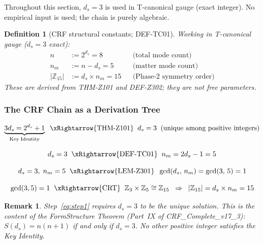 \documentclass[12pt, a4paper]{article}
\newtheorem{definition}{Definition}[section]
\newtheorem{remark}{Remark}[section]
\begin{document}
Throughout this section, $d_s = 3$ is used in T-canonical gauge
(exact integer). No empirical input is used; the chain is purely
algebraic.

\begin{definition}[CRF structural constants; DEF-TC01]
\label{def:crf-constants}
Working in T-canonical gauge ($d_s = 3$ exact):
\begin{align}
  n &:= 2^{d_s} = 8 & &\text{(total mode count)} \\
  n_m &:= n - d_s = 5 & &\text{(matter mode count)} \\
  |\mathbb{Z}_{15}| &:= d_s \times n_m = 15 & &\text{(Phase-2 symmetry order)}
\end{align}
These are derived from THM-Z101 and DEF-Z302; they are not free
parameters.
\end{definition}

\subsubsection{The CRF Chain as a Derivation Tree}

\begin{formalbox}[title={CRF derivation chain (EQ-TC01)}]
\begin{equation}
  \underbrace{3d_s = 2^{d_s}+1}_{\rm Key\;Identity}
  \;\;\xRightarrow{\rm THM\text{-}Z101}\;\;
  d_s = 3 \;\;(\text{unique among positive integers})
  \label{eq:step1}
\end{equation}

\begin{equation}
  d_s = 3
  \;\;\xRightarrow{\rm DEF\text{-}TC01}\;\;
  n_m = 2d_s - 1 = 5
  \label{eq:step2}
\end{equation}

\begin{equation}
  d_s = 3,\; n_m = 5
  \;\;\xRightarrow{\rm LEM\text{-}Z301}\;\;
  \gcd(d_s,\, n_m) = \gcd(3,\, 5) = 1
  \label{eq:step3}
\end{equation}

\begin{equation}
  \gcd(3,5) = 1
  \;\;\xRightarrow{\rm CRT}\;\;
  \mathbb{Z}_3 \times \mathbb{Z}_5 \cong \mathbb{Z}_{15}
  \;\;\Rightarrow\;\;
  |\mathbb{Z}_{15}| = d_s \times n_m = 15
  \label{eq:step4}
\end{equation}
\end{formalbox}

\begin{remark}
Step~\eqref{eq:step1} requires $d_s = 3$ to be the unique solution.
This is the content of the FormStructure Theorem (Part~IX of
CRF\_Complete\_v17\_3): $S(d_s) = n(n+1)$ if and only if $d_s = 3$.
No other positive integer satisfies the Key Identity.
\end{remark}
\end{document}

